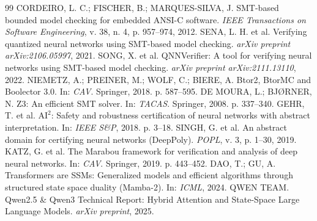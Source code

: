 \documentclass[11pt,a4paper]{article}
\theoremstyle{definition}
\begin{document}
\vspace{0.3cm}
\begin{thebibliography}{99}
 CORDEIRO, L. C.; FISCHER, B.; MARQUES-SILVA, J. SMT-based bounded model checking for embedded ANSI-C software. \textit{IEEE Transactions on Software Engineering}, v. 38, n. 4, p. 957--974, 2012.
 SENA, L. H. et al. Verifying quantized neural networks using SMT-based model checking. \textit{arXiv preprint arXiv:2106.05997}, 2021.
 SONG, X. et al. QNNVerifier: A tool for verifying neural networks using SMT-based model checking. \textit{arXiv preprint arXiv:2111.13110}, 2022.
 NIEMETZ, A.; PREINER, M.; WOLF, C.; BIERE, A. Btor2, BtorMC and Boolector 3.0. In: \textit{CAV}. Springer, 2018. p. 587--595.
 DE MOURA, L.; BJ{\O}RNER, N. Z3: An efficient SMT solver. In: \textit{TACAS}. Springer, 2008. p. 337--340.
 GEHR, T. et al. $\text{AI}^2$: Safety and robustness certification of neural networks with abstract interpretation. In: \textit{IEEE S\&P}, 2018. p. 3--18.
 SINGH, G. et al. An abstract domain for certifying neural networks (DeepPoly). \textit{POPL}, v. 3, p. 1--30, 2019.
 KATZ, G. et al. The Marabou framework for verification and analysis of deep neural networks. In: \textit{CAV}. Springer, 2019. p. 443--452.
 DAO, T.; GU, A. Transformers are SSMs: Generalized models and efficient algorithms through structured state space duality (Mamba-2). In: \textit{ICML}, 2024.
 QWEN TEAM. Qwen2.5 \& Qwen3 Technical Report: Hybrid Attention and State-Space Large Language Models. \textit{arXiv preprint}, 2025.
\end{thebibliography}
\end{document}
